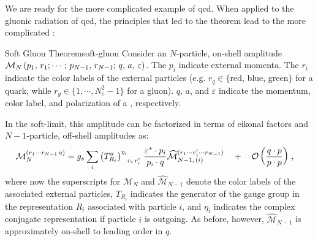 We are ready for the more complicated example of \gls{qcd}.
%
When applied to the gluonic radiation of \gls{qcd}, the principles that led to the  theorem lead to the more complicated :
\begin{theorembox}{Soft Gluon Theorem}{soft-gluon}
    Consider an \(N\)-particle, on-shell amplitude \(\mathcal{M}_N\left(p_1,\,r_1; \cdots;\,p_{N-1},\,r_{N-1};\,q,\,a,\,\varepsilon\right)\).
    The \(p_i\) indicate external momenta.
    The \(r_i\) indicate the color labels of the external particles (e.g. \(r_q \in \{\)red, blue, green\(\}\) for a quark, while \(r_g \in \{1,\cdots,N_c^2-1\}\) for a gluon).
    \(q\), \(a\), and \(\varepsilon\) indicate the momentum, color label, and polarization of a , respectively.

    In the \gls{soft-limit}, this amplitude can be factorized in terms of eikonal factors and \(N-1\)-particle, off-shell amplitudes as:
    \begin{equation}
    \begin{aligned}
        \mathcal{M}^{(r_1\cdots r_{N-1}\,a)}_N
        &=
        g_s
        \sum_{i}
        \le(T^a_{R_i}\ri)\indices{^{\eta_i}_{r_i\,r'_i}}
        \,
        \frac{\varepsilon^* \cdot p_i}{p_i \cdot q}
        \widehat{\mathcal{M}}
        ^{(r_1\cdots r'_i\cdots r_{N-1})}
        _{N-1,\,(i)}
        \quad
        +
        \quad
        \mathcal{O}\le(\frac{q\cdot p}{p \cdot p}\ri)
        \,,
    \end{aligned}
    \end{equation}
    where now the superscripts for \(\mathcal{M}_N\) and \(\widehat{\mathcal{M}}_{N-1}\) denote the color labels of the associated external particles, \(T_{R_i}\) indicates the generator of the gauge group in the representation \(R_i\) associated with particle \(i\), and \(\eta_i\) indicates the complex conjugate representation if particle \(i\) is outgoing.
    As before, however, \(\widehat{\mathcal{M}}_{N-1}\) is approximately on-shell to leading order in \(q\).
\end{theorembox}


